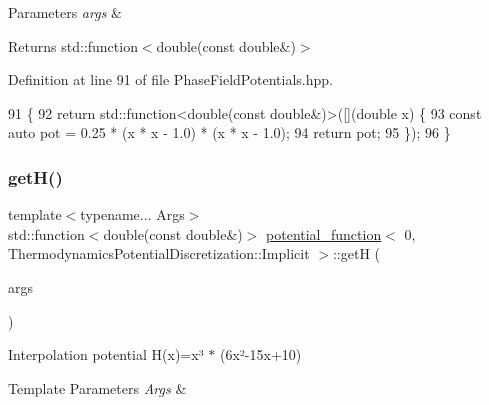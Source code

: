 \begin{DoxyParams}{Parameters}
{\em args} & \\
\hline
\end{DoxyParams}
\begin{DoxyReturn}{Returns}
std\+::function$<$double(const double\&)$>$ 
\end{DoxyReturn}


Definition at line 91 of file Phase\+Field\+Potentials.\+hpp.


\begin{DoxyCode}
91                                                         \{
92     \textcolor{keywordflow}{return} std::function<double(const double&)>([](\textcolor{keywordtype}{double} x) \{
93       \textcolor{keyword}{const} \textcolor{keyword}{auto} pot = 0.25 * (x * x - 1.0) * (x * x - 1.0);
94       \textcolor{keywordflow}{return} pot;
95     \});
96   \}
\end{DoxyCode}
\mbox{\label{structpotential__function_3_010_00_01ThermodynamicsPotentialDiscretization_1_1Implicit_01_4_a74d232601bbe797c14897e297134c938}} 
\subsubsection{\texorpdfstring{get\+H()}{getH()}}
{\footnotesize\ttfamily template$<$typename... Args$>$ \\
std\+::function$<$double(const double\&)$>$ \hyperlink{structpotential__function}{potential\+\_\+function}$<$ 0, Thermodynamics\+Potential\+Discretization\+::\+Implicit $>$\+::getH (\begin{DoxyParamCaption}\item[{Args...}]{args }\end{DoxyParamCaption})\hspace{0.3cm}{\ttfamily [inline]}}



Interpolation potential H(x)=x³ $\ast$ (6x²-\/15x+10) 


\begin{DoxyTemplParams}{Template Parameters}
{\em Args} & \\
\hline
\end{DoxyTemplParams}

